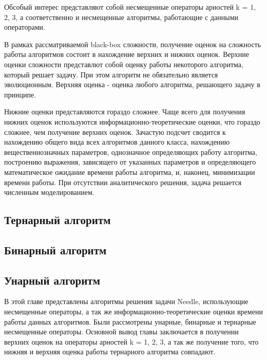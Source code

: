 Обсобый интерес представляют собой несмещенные операторы арностей k = 1, 2, 3, а соответственно и несмещенные алгоритмы, работающие с данными операторами.

В рамках рассматриваемой black-box сложности, получение оценок на сложность работы алгоритмов состоит в нахождение верхних и нижних оценок. Верхние оценки сложности представлют собой оценку работы некоторого алгоритма, который решает задачу. При этом алгоритм не обязательно является эволюционным. Верхняя оценка - оценка любого алгоритма, решающего задачу в принципе. 

Нижние оценки представляются гораздо сложнее. Чаще всего для получения нижних оценок используются информационно-теоретические оценки, что гораздо сложнее, чем получение верхних оценок. Зачастую подсчет сводится к нахождению общего вида всех алгоритмов данного класса, нахождению вещественнозначных параметров, однозначное определяющих работу алгоритма, построению выражения, зависящего от указанных параметров и определяющего математическое ожидание времени работы алгоритма, и, наконец, минимизации времени работы. При отсутствии аналитического решения, задача решается численным моделированием.   

\subsection{Тернарный алгоритм}


\subsection{Бинарный алгоритм}


\subsection{Унарный алгоритм}




\chapterconclusion

В этой главе представлены алгоритмы решения задачи Needle, использующие несмещенные операторы, а так же информационно-теоретические оценки времени работы данных алгоритмов. Были рассмотрены унарные, бинарные и тернарные несмещенные операторы. 
Основной вывод главы заключается в получении верхних оценок на операторы арностей k = 1, 2, 3, а так же получение того, что нижняя и верхняя оценка работы тернарного алгоритма совпадают.









